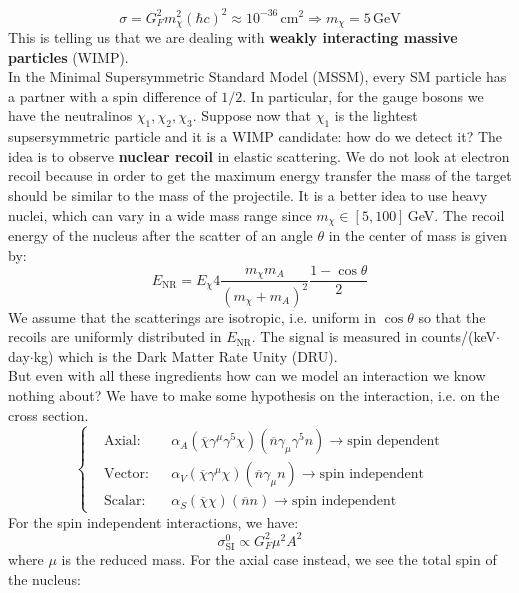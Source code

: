 \documentclass[10.75pt,a4paper,openright,bottom=2cm]{article}
\begin{document}
\[
\sigma=G_F^2m_\chi^2(\hbar c)^2\approx10^{-36}\,\text{cm$^2$} \Rightarrow m_\chi=5\,\text{GeV}
\]
This is telling us that we are dealing with \textbf{weakly interacting massive particles} (WIMP).\\
In the Minimal Supersymmetric Standard Model (MSSM), every SM particle has a partner with a spin difference of $1/2$. In particular, for the gauge bosons we have the neutralinos $\chi_1, \chi_2, \chi_3$. Suppose now that $\chi_1$ is the lightest supsersymmetric particle and it is a WIMP candidate: how do we detect it? The idea is to observe \textbf{nuclear recoil} in elastic scattering. We do not look at electron recoil because in order to get the maximum energy transfer the mass of the target should be similar to the mass of the projectile. It is a better idea to use heavy nuclei, which can vary in a wide mass range since $m_\chi\in[5,100]$\,GeV. The recoil energy of the nucleus after the scatter of an angle $\theta$ in the center of mass is given by:
\[
E_{\text{NR}}=E_\chi 4\frac{m_\chi m_A}{(m_\chi+m_A)^2}\frac{1-\cos\theta}{2}
\]
We assume that the scatterings are isotropic, i.e. uniform in $\cos\theta$ so that the recoils are uniformly distributed in $E_{\text{NR}}$. The signal is measured in counts/(keV$\cdot$day$\cdot$kg) which is the Dark Matter Rate Unity (DRU).\\
But even with all these ingredients how can we model an interaction we know nothing about? We have to make some hypothesis on the interaction, i.e. on the cross section.
\[
\left\{
\begin{aligned}
&\text{Axial:}&&\alpha_A(\overline{\chi}\gamma^\mu\gamma^5\chi)(\overline{n}\gamma_\mu\gamma^5n)\to\text{spin dependent}\\
&\text{Vector:}&&\alpha_V(\overline{\chi}\gamma^\mu\chi)(\overline{n}\gamma_\mu n)\to\text{spin independent}\\
&\text{Scalar:}&&\alpha_S(\overline{\chi}\chi)(\overline{n}n)\to\text{spin independent}
\end{aligned}
\right.
\]
For the spin independent interactions, we have:
\[
\sigma_{\text{SI}}^0\propto G_F^2\mu^2A^2
\]
where $\mu$ is the reduced mass. For the axial case instead, we see the total spin of the nucleus:
\end{document}
